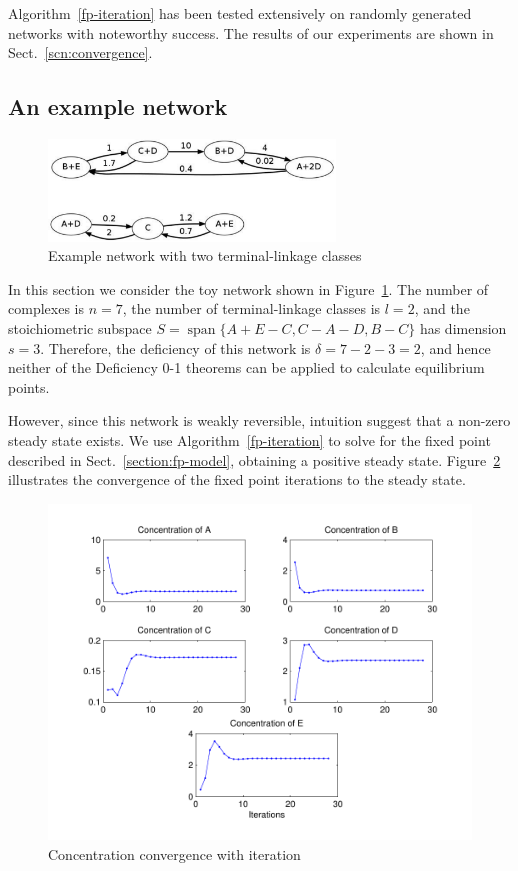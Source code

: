 \documentclass[smallextended]{svjour3}       %
\newcommand*{\0}{\mathbf{0}}
\newcommand*{\1}{\mathbf{1}}
\begin{document}
Algorithm~\ref{fp-iteration} has been tested extensively on randomly generated
networks with noteworthy success. The results of our experiments are shown in
Sect.~\ref{scn:convergence}.

\subsection{An example network}
\label{example-network}

\begin{figure}%
   \centering
   \includegraphics[width=3in]{paperNetwork}
   \caption{Example network with two terminal-linkage classes}
   \label{fig:network-small}
\end{figure}

In this section we consider the toy network shown in
Figure~\ref{fig:network-small}.  The number of complexes is $n = 7$, the number of
terminal-linkage classes is $l = 2$, and the stoichiometric subspace $S =
\operatorname{span}\{ A+E-C, C-A-D, B-C\}$ has dimension $s = 3$.  Therefore,
the deficiency of this network is $\delta = 7 - 2 - 3 = 2$, and hence neither
of the Deficiency 0-1 theorems \cite{deficiency0,deficiency1} can be applied
to calculate equilibrium points. 

However, since this network is weakly reversible, intuition suggest that a
non-zero steady state exists.  We use Algorithm~\ref{fp-iteration} to solve for
the fixed point described in Sect.~\ref{section:fp-model}, obtaining a
positive steady state.  Figure~\ref{fig:ConcentrationVsIteration} illustrates
the convergence of the fixed point iterations to the steady state.

\begin{figure}%
   \sidecaption
   \includegraphics[width=4.5in]{ConcentrationVsIterationExample}
   \caption{Concentration convergence with iteration}
   \label{fig:ConcentrationVsIteration}
\end{figure}
\end{document}
